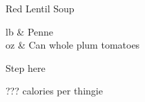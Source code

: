 \begin{recipe}
[ %
    preparationtime = {\unit[30]{m}},
    bakingtime,
    bakingtemperature,
    portion = {\portion{???}},
    calory={???},
]
{Red Lentil Soup}
    
    \graph
    {%
    }
    
    \ingredients
    {%
        \unit[1]{lb}   	  & Penne \\
        \unit[28]{oz}	  & Can whole plum tomatoes
    }
    
    \preparation
    {%
        \step Step here
    }      
    
    \hint
    {%
        ??? calories per thingie
    }

\end{recipe}